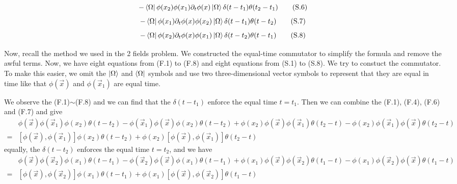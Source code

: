 \documentclass[12pt,openany]{book}
\begin{document}
   \begin{equation}
   	-\bra{\Omega}\phi(x_2)\phi(x_1)\partial_t\phi(x)\ket{\Omega}\delta(t-t_1)\theta(t_2-t_1) \tag{S.6}
   \end{equation}
   \begin{equation}
   	-\bra{\Omega}\phi(x_1)\partial_t\phi(x)\phi(x_2)\ket{\Omega}\delta(t-t_1)\theta(t-t_2) \tag{S.7}
   \end{equation}
   \begin{equation}
   	-\bra{\Omega}\phi(x_2)\partial_t\phi(x)\phi(x_1)\ket{\Omega}\delta(t-t_2)\theta(t-t_1) \tag{S.8}
   \end{equation}
	\par 
	Now, recall the method we used in the 2 fields problem. We constructed the equal-time commutator to simplify the formula and remove the awful terms. Now, we have eight equations from (F.1) to (F.8) and eight equations
	from (S.1) to (S.8). We try to constuct the commutator. To make this easier, we omit the $\ket{\Omega}$ and $\bra{\Omega}$ symbols and use two three-dimensional vector symbols to represent that they are equal in time like that
	$\phi(\vec{x})$ and $\phi(\vec{x}_1)$ are equal time.
	\par 
	We observe the (F.1)$\sim$(F.8) and we can find that the $\delta(t-t_1)$ enforce the equal time $t=t_1$. Then we can combine the (F.1), (F.4), (F.6) and (F.7) and give
	\begin{equation}\label{com1}
		\begin{aligned}
			&\phi(\vec{x})\phi(\vec{x}_1)\phi(x_2)\theta(t-t_2)-\phi(\vec{x}_1)\phi(\vec{x})\phi(x_2)\theta(t-t_2)+\phi(x_2)\phi(\vec{x})\phi(\vec{x}_1)\theta(t_2-t)-\phi(x_2)\phi(\vec{x}_1)\phi(\vec{x})\theta(t_2-t)\\
		   =&\left[\phi(\vec{x}),\phi(\vec{x}_1)\right]\phi(x_2)\theta(t-t_2)+\phi(x_2)\left[\phi(\vec{x}),\phi(\vec{x}_1)\right]\theta(t_2-t)
		\end{aligned}
	\end{equation}
	equally, the $\delta(t-t_2)$ enforces the equal time $t=t_2$, and we have
	\begin{equation}\label{com2}
		\begin{aligned}
			&\phi(\vec{x})\phi(\vec{x}_2)\phi(x_1)\theta(t-t_1)-\phi(\vec{x}_2)\phi(\vec{x})\phi(x_1)\theta(t-t_1)+\phi(x_1)\phi(\vec{x})\phi(\vec{x}_2)\theta(t_1-t)-\phi(x_1)\phi(\vec{x}_2)\phi(\vec{x})\theta(t_1-t)\\
		   =&\left[\phi(\vec{x}),\phi(\vec{x}_2)\right]\phi(x_1)\theta(t-t_1)+\phi(x_1)\left[\phi(\vec{x}),\phi(\vec{x}_2)\right]\theta(t_1-t)
		\end{aligned}
	\end{equation}
\end{document}
